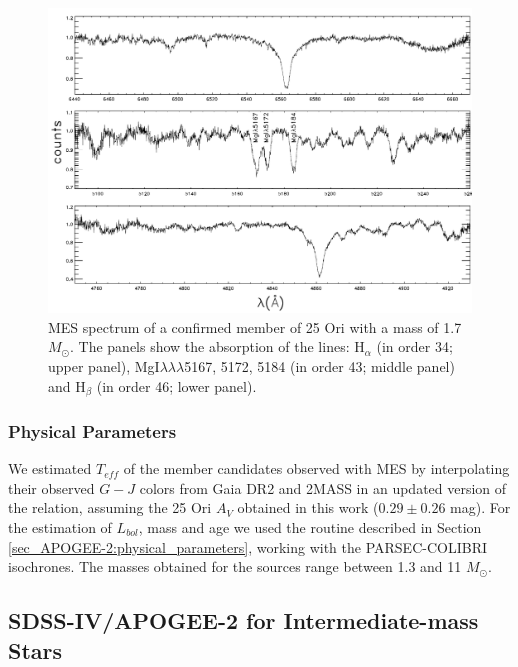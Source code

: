 \documentclass[12pt]{article}
\begin{document}
\begin{figure}[ht!]
	\centering
	\includegraphics[width=1.\textwidth]{MES_spectrum.pdf}
	\caption[MES spectrum of a confirmed member of 25 Ori]{MES spectrum of a confirmed member of 25 Ori with a mass of 1.7 $M_\odot$. The panels show the absorption of the lines: H$_\alpha$ (in order 34; upper panel), MgI$\lambda\lambda\lambda$5167, 5172, 5184 (in order 43; middle panel) and H$_\beta$ (in order 46; lower panel).}
	\label{fig_MES:spectrum}
\end{figure}

\subsubsection{Physical Parameters}
\label{sec_MES:phy_par}
We estimated $T_{eff}$ of the member candidates observed with MES by interpolating their observed $G-J$ colors from Gaia DR2 and 2MASS in an updated version of the \citet{Kenyon-Hartmann1995} relation, assuming the 25 Ori $A_V$ obtained in this work ($0.29\pm0.26$ mag). For the estimation of $L_{bol}$, mass and age we used the routine described in Section \ref{sec_APOGEE-2:physical_parameters}, working with the PARSEC-COLIBRI isochrones. The masses obtained for the sources range between 1.3 and 11 $M_\odot$.

\subsection{SDSS-IV/APOGEE-2 for Intermediate-mass Stars}
\label{sec:APOGEE-2}
\end{document}
